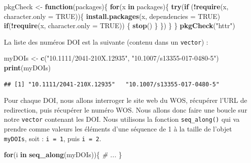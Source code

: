 \documentclass[
]{book}
\newenvironment{Shaded}{\begin{snugshade}}{\end{snugshade}}
\newcommand{\CommentTok}[1]{\textcolor[rgb]{0.56,0.35,0.01}{\textit{#1}}}
\newcommand{\ControlFlowTok}[1]{\textcolor[rgb]{0.13,0.29,0.53}{\textbf{#1}}}
\newcommand{\DataTypeTok}[1]{\textcolor[rgb]{0.13,0.29,0.53}{#1}}
\newcommand{\KeywordTok}[1]{\textcolor[rgb]{0.13,0.29,0.53}{\textbf{#1}}}
\newcommand{\NormalTok}[1]{#1}
\newcommand{\OperatorTok}[1]{\textcolor[rgb]{0.81,0.36,0.00}{\textbf{#1}}}
\newcommand{\OtherTok}[1]{\textcolor[rgb]{0.56,0.35,0.01}{#1}}
\newcommand{\StringTok}[1]{\textcolor[rgb]{0.31,0.60,0.02}{#1}}
\begin{document}
\begin{Shaded}
\begin{Highlighting}[]
\NormalTok{pkgCheck <-}\StringTok{ }\ControlFlowTok{function}\NormalTok{(packages)\{}
    \ControlFlowTok{for}\NormalTok{(x }\ControlFlowTok{in}\NormalTok{ packages)\{}
        \KeywordTok{try}\NormalTok{(}\ControlFlowTok{if}\NormalTok{ (}\OperatorTok{!}\KeywordTok{require}\NormalTok{(x, }\DataTypeTok{character.only =} \OtherTok{TRUE}\NormalTok{))\{}
            \KeywordTok{install.packages}\NormalTok{(x, }\DataTypeTok{dependencies =} \OtherTok{TRUE}\NormalTok{)}
            \ControlFlowTok{if}\NormalTok{(}\OperatorTok{!}\KeywordTok{require}\NormalTok{(x, }\DataTypeTok{character.only =} \OtherTok{TRUE}\NormalTok{)) \{}
                \KeywordTok{stop}\NormalTok{()}
\NormalTok{            \}}
\NormalTok{        \})}
\NormalTok{    \}}
\NormalTok{\}}
\KeywordTok{pkgCheck}\NormalTok{(}\StringTok{"httr"}\NormalTok{)}
\end{Highlighting}
\end{Shaded}

La liste des numéros DOI est la suivante (contenu dans un \texttt{vector}) :

\begin{Shaded}
\begin{Highlighting}[]
\NormalTok{myDOIs <-}\StringTok{ }\KeywordTok{c}\NormalTok{(}\StringTok{"10.1111/2041-210X.12935"}\NormalTok{, }\StringTok{"10.1007/s13355-017-0480-5"}\NormalTok{)}
\KeywordTok{print}\NormalTok{(myDOIs)}
\end{Highlighting}
\end{Shaded}

\begin{verbatim}
## [1] "10.1111/2041-210X.12935"   "10.1007/s13355-017-0480-5"
\end{verbatim}

Pour chaque DOI, nous allons interroger le site web du WOS, récupérer l'URL de redirection, puis récupérer le numéro WOS. Nous allons donc faire une boucle sur notre \texttt{vector} contenant les DOI. Nous utilisons la fonction \texttt{seq\_along()} qui va prendre comme valeurs les éléments d'une séquence de 1 à la taille de l'objet \texttt{myDOIs}, soit : \texttt{i\ =\ 1}, puis \texttt{i\ =\ 2}.

\begin{Shaded}
\begin{Highlighting}[]
\ControlFlowTok{for}\NormalTok{(i }\ControlFlowTok{in} \KeywordTok{seq_along}\NormalTok{(myDOIs))\{}
  \CommentTok{# ...}
\NormalTok{\}}
\end{Highlighting}
\end{Shaded}
\end{document}
